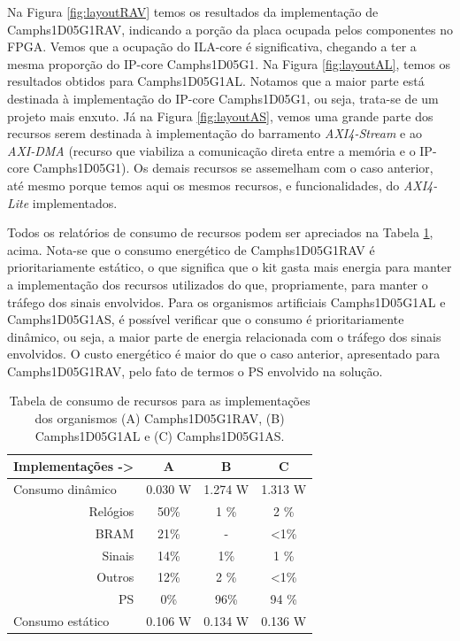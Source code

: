 Na Figura \ref{fig:layoutRAV} temos os resultados da implementação de Camphs1D05G1RAV, indicando a porção da placa ocupada pelos componentes no FPGA. Vemos que a ocupação do ILA-core é significativa, chegando a ter a mesma proporção do IP-core Camphs1D05G1. Na Figura \ref{fig:layoutAL}, temos os resultados obtidos para Camphs1D05G1AL. Notamos que a maior parte está destinada à implementação do IP-core Camphs1D05G1, ou seja, trata-se de um projeto mais enxuto. Já na Figura \ref{fig:layoutAS}, vemos uma grande parte dos recursos serem destinada à implementação do barramento \textit{AXI4-Stream} e ao \textit{AXI-DMA} (recurso que viabiliza a comunicação direta entre a memória e o IP-core Camphs1D05G1). Os demais recursos se assemelham com o caso anterior, até mesmo porque temos aqui os mesmos recursos, e funcionalidades, do \textit{AXI4-Lite} implementados.

Todos os relatórios de consumo de recursos podem ser apreciados na Tabela \ref{fig:power}, acima. Nota-se que o consumo energético de Camphs1D05G1RAV é prioritariamente estático, o que significa que o kit gasta mais energia para manter a implementação dos recursos utilizados do que, propriamente, para manter o tráfego dos sinais envolvidos. Para os organismos artificiais Camphs1D05G1AL e Camphs1D05G1AS, é possível verificar que o consumo é prioritariamente dinâmico, ou seja, a maior parte de energia relacionada com o tráfego dos sinais envolvidos. O custo energético é maior do que o caso anterior, apresentado para Camphs1D05G1RAV, pelo fato de termos o PS envolvido na solução.

\begin{table}[]
\caption{\label{fig:power}Tabela de consumo de recursos para as implementações dos organismos (A) Camphs1D05G1RAV, (B) Camphs1D05G1AL e (C) Camphs1D05G1AS.}
\centering
\begin{tabular}{|r|c|c|c|}
\hline
\multicolumn{1}{|l|}{Implementações -\textgreater{}} & A       & B       & C             \\ \hline
\multicolumn{1}{|l|}{Consumo dinâmico}               & 0.030 W & 1.274 W & 1.313 W       \\ \hline
Relógios                                             & 50\%    & 1 \%    & 2 \%          \\ \hline
BRAM                                                 & 21\%    & -       & \textless 1\% \\ \hline
Sinais                                               & 14\%    & 1\%     & 1 \%          \\ \hline
Outros                                               & 12\%    & 2 \%    & \textless 1\% \\ \hline
PS                                                   & 0\%     & 96\%    & 94 \%         \\ \hline
\multicolumn{1}{|l|}{Consumo estático}               & 0.106 W & 0.134 W & 0.136 W       \\ \hline
\end{tabular}
\end{table}

